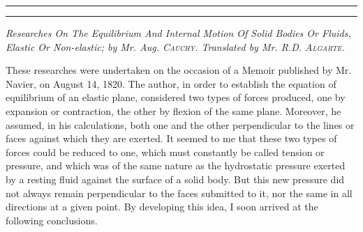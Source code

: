 \documentclass[openright,smallroyalvopaper,8pt,twoside,showtrims]{memoir}
\begin{document}
\vspace*{1.5cm}
\noindent
\rule{\textwidth}{0.5pt}\vspace*{-\baselineskip}\vspace*{2pt} 
\rule{\textwidth}{0.5pt} 
\vspace*{.2cm}
\begin{center}
\emph{Researches On The Equilibrium And Internal Motion Of Solid Bodies Or Fluids, Elastic Or Non-elastic; by Mr. Aug. {\normalfont\scshape Cauchy}. Translated by Mr. R.D. {\normalfont\scshape Algarte}.}
\end{center}
\normalfont
These researches were undertaken on the occasion of a Memoir published by Mr. Navier, on August 14, 1820. The author, in order to establish the equation of equilibrium of an elastic plane, considered two types of forces produced, one by expansion or contraction, the other by flexion of the same plane. Moreover, he assumed, in his calculations, both one and the other perpendicular to the lines or faces against which they are exerted. It seemed to me that these two types of forces could be reduced to one, which must constantly be called tension or pressure, and which was of the same nature as the hydrostatic pressure exerted by a resting fluid against the surface of a solid body. But this new pressure did not always remain perpendicular to the faces submitted to it, nor the same in all directions at a given point. By developing this idea, I soon arrived at the following conclusions. 
\end{document}
